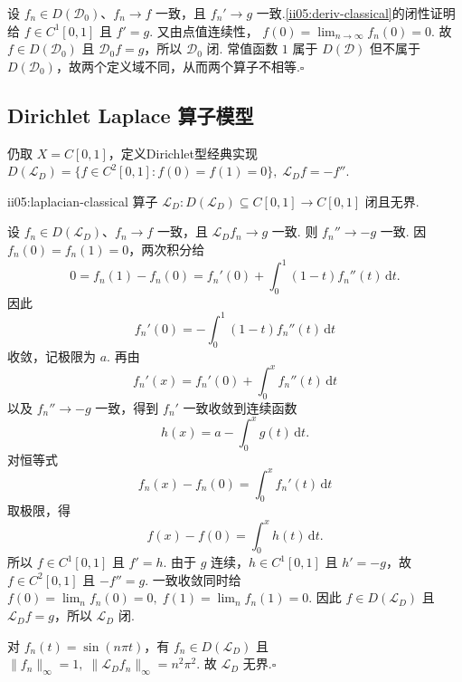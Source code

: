 \begin{FAProof}
设 \(\displaystyle f_n\in D(\mathcal D_0)\)、\(\displaystyle f_n\to f\) 一致，且 \(\displaystyle f_n'\to g\) 一致.\autoref{ii05:deriv-classical}的闭性证明给 \(\displaystyle f\in C^1[0,1]\) 且 \(\displaystyle f'=g\). 又由点值连续性，
\(\displaystyle f(0)=\lim_{n\to\infty}f_n(0)=0.\)
故 \(\displaystyle f\in D(\mathcal D_0)\) 且 \(\displaystyle\mathcal D_0f=g\)，所以 \(\displaystyle\mathcal D_0\) 闭. 常值函数 \(\displaystyle1\) 属于 \(\displaystyle D(\mathcal D)\) 但不属于 \(\displaystyle D(\mathcal D_0)\)，故两个定义域不同，从而两个算子不相等.\hfill\(\square\)
\end{FAProof}

\subsection{Dirichlet Laplace 算子模型}

仍取 \(\displaystyle X=C[0,1]\)，定义Dirichlet型经典实现
\(\displaystyle D(\mathcal L_D) = \{f\in C^2[0,1]:f(0)=f(1)=0\}, \; \mathcal L_Df=-f''.\)

\begin{FAProposition}[B][经典Dirichlet实现闭且无界]{ii05:laplacian-classical}
算子
\(\displaystyle \mathcal L_D:D(\mathcal L_D)\subseteq C[0,1]\to C[0,1]\)
闭且无界.
\end{FAProposition}

\begin{FAProof}
设 \(\displaystyle f_n\in D(\mathcal L_D)\)、\(\displaystyle f_n\to f\) 一致，且 \(\displaystyle\mathcal L_Df_n\to g\) 一致. 则
\(\displaystyle f_n''\longrightarrow-g\)
一致. 因 \(\displaystyle f_n(0)=f_n(1)=0\)，两次积分给
\[
0
=
f_n(1)-f_n(0)
=
f_n'(0)+\int_0^1(1-t)f_n''(t)\,\mathrm{d}t.
\]
因此
\[
f_n'(0)
=
-\int_0^1(1-t)f_n''(t)\,\mathrm{d}t
\]
收敛，记极限为 \(\displaystyle a\). 再由
\[
f_n'(x)
=
f_n'(0)+\int_0^x f_n''(t)\,\mathrm{d}t
\]
以及 \(\displaystyle f_n''\to-g\) 一致，得到 \(\displaystyle f_n'\) 一致收敛到连续函数
\[
h(x)=a-\int_0^x g(t)\,\mathrm{d}t.
\]
对恒等式
\[
f_n(x)-f_n(0)=\int_0^x f_n'(t)\,\mathrm{d}t
\]
取极限，得
\[
f(x)-f(0)=\int_0^x h(t)\,\mathrm{d}t.
\]
所以 \(\displaystyle f\in C^1[0,1]\) 且 \(\displaystyle f'=h\). 由于 \(\displaystyle g\) 连续，\(\displaystyle h\in C^1[0,1]\) 且 \(\displaystyle h'=-g\)，故 \(\displaystyle f\in C^2[0,1]\) 且 \(\displaystyle-f''=g\). 一致收敛同时给
\(\displaystyle f(0)=\lim_nf_n(0)=0, \; f(1)=\lim_nf_n(1)=0.\)
因此 \(\displaystyle f\in D(\mathcal L_D)\) 且 \(\displaystyle\mathcal L_Df=g\)，所以 \(\displaystyle\mathcal L_D\) 闭.

对 \(\displaystyle f_n(t)=\sin(n\pi t)\)，有 \(\displaystyle f_n\in D(\mathcal L_D)\) 且
\(\displaystyle \|f_n\|_\infty=1, \; \|\mathcal L_Df_n\|_\infty=n^2\pi^2.\)
故 \(\displaystyle\mathcal L_D\) 无界.\hfill\(\square\)
\end{FAProof}

